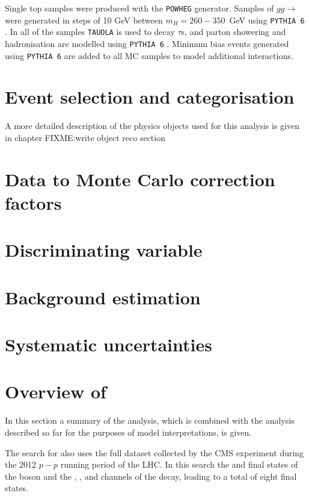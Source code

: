 Single top samples were produced with the \texttt{POWHEG} \cite{powheg1,powheg2} generator. Samples of $gg\rightarrow$\Htohhtobbtautau
were generated in steps of 10 GeV between $m_H = 260 - 350$~GeV using \texttt{PYTHIA 6} \cite{pythia64}. In all of the samples
\texttt{TAUOLA} \cite{tauola} is used to decay $\tau$s, and parton showering and hadronisation are modelled using \texttt{PYTHIA 6} \cite{pythia64}.
Minimum bias events generated using \texttt{PYTHIA 6} are added to all MC samples to model additional
interactions. 

\section{Event selection and categorisation}
\label{sec:hhh_selection}
A more detailed description of the physics objects used for this analysis is given in chapter FIXME:write object reco section


\section{Data to Monte Carlo correction factors}
\label{sec:hhh_datamc}

\section{Discriminating variable}
\label{sec:hhh_discr}

\section{Background estimation}
\label{sec:hhh_backgrounds}

\section{Systematic uncertainties}
\label{sec:hhh_uncs}

\section{\texorpdfstring{Overview of \AtoZhtolltautau}{Overview of A->Zh->lltautau}}
\label{sec:hhh_azh}
In this section a summary of the \AtoZhtolltautau analysis, which is combined with the 
analysis described so far for the purposes of model interpretations, is given.

The search for \AtoZhtolltautau also uses the full dataset collected by the CMS experiment during
the 2012 $p-p$ running period of the LHC. In this search the \mumu and \ee final states of the \PZ boson
and the \emu, \etau, \mutau and \tautau channels of the \htotautau decay, leading to a total of
eight final states. 

